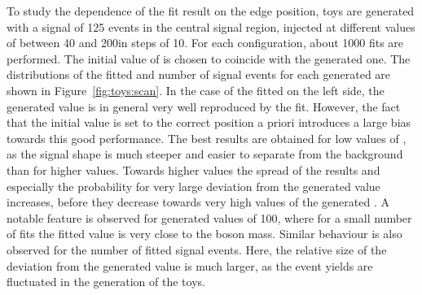 To study the dependence of the fit result on the edge position, toys are generated with a signal of 125 events in the central signal region, injected at different values of \mlledge between 40 and 200\GeV in steps of 10\GeV. For each configuration, about 1000 fits are performed. The initial value of \mlledge is chosen to coincide with the generated one. The distributions of the fitted \mlledge and number of signal events for each generated \mlledge are shown in Figure~\ref{fig:toys:scan}. In the case of the fitted \mlledge on the left side, the generated value is in general very well reproduced by the fit. However, the fact that the initial value is set to the correct position a priori introduces a large bias towards this good performance. The best results are obtained for low values of \mlledge, as the signal shape is much steeper and easier to separate from the background than for higher values. Towards higher values the spread of the results and especially the probability for very large deviation from the generated value increases, before they decrease towards very high values of the generated \mlledge. A notable feature is observed for generated values of 100\GeV, where for a small number of fits the fitted value is very close to the \Z boson mass. Similar behaviour is also observed for the number of fitted signal events. Here, the relative size of the deviation from the generated value is much larger, as the event yields are fluctuated in the generation of the toys. 
